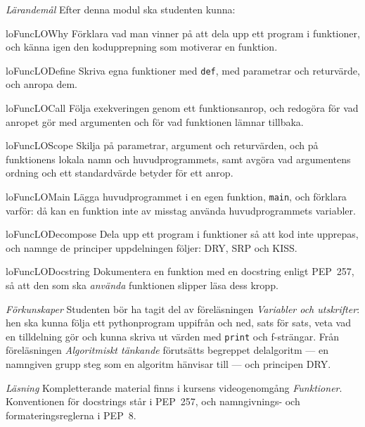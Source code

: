 \emph{Lärandemål}
Efter denna modul ska studenten kunna:
\begin{restatable}{lo}{FuncLOWhy}\label{FuncLOWhy}%
  Förklara vad man vinner på att dela upp ett program i funktioner, och
  känna igen den kodupprepning som motiverar en funktion.
\end{restatable}
\begin{restatable}{lo}{FuncLODefine}\label{FuncLODefine}%
  Skriva egna funktioner med \texttt{def}, med parametrar och
  returvärde, och anropa dem.
\end{restatable}
\begin{restatable}{lo}{FuncLOCall}\label{FuncLOCall}%
  Följa exekveringen genom ett funktionsanrop, och redogöra för vad
  anropet gör med argumenten och för vad funktionen lämnar tillbaka.
\end{restatable}
\begin{restatable}{lo}{FuncLOScope}\label{FuncLOScope}%
  Skilja på parametrar, argument och returvärden, och på funktionens
  lokala namn och huvudprogrammets, samt avgöra vad argumentens ordning
  och ett standardvärde betyder för ett anrop.
\end{restatable}
\begin{restatable}{lo}{FuncLOMain}\label{FuncLOMain}%
  Lägga huvudprogrammet i en egen funktion, \texttt{main},
  och förklara varför: då kan en funktion inte av misstag använda
  huvudprogrammets variabler.
\end{restatable}
\begin{restatable}{lo}{FuncLODecompose}\label{FuncLODecompose}%
  Dela upp ett program i funktioner så att kod inte upprepas, och namnge
  de principer uppdelningen följer: DRY, SRP och KISS.
\end{restatable}
\begin{restatable}{lo}{FuncLODocstring}\label{FuncLODocstring}%
  Dokumentera en funktion med en
  \foreignlanguage{english}{docstring} enligt PEP~257, så att den som ska
  \emph{använda} funktionen slipper läsa dess kropp.
\end{restatable}

\emph{Förkunskaper}
Studenten bör ha tagit del av föreläsningen \emph{Variabler och
utskrifter}: hen ska kunna följa ett pythonprogram uppifrån och ned, sats
för sats, veta vad en tilldelning gör och kunna skriva ut värden med
\texttt{print} och f-strängar.  Från föreläsningen
\emph{Algoritmiskt tänkande} förutsätts begreppet delalgoritm --- en
namngiven grupp steg som en algoritm hänvisar till --- och principen DRY.

\emph{Läsning}
Kompletterande material finns i kursens videogenomgång \emph{Funktioner}.
Konventionen för docstrings står i PEP~257\autocite{pep257}, och
namngivnings- och formateringsreglerna i PEP~8\autocite{pep8}.
